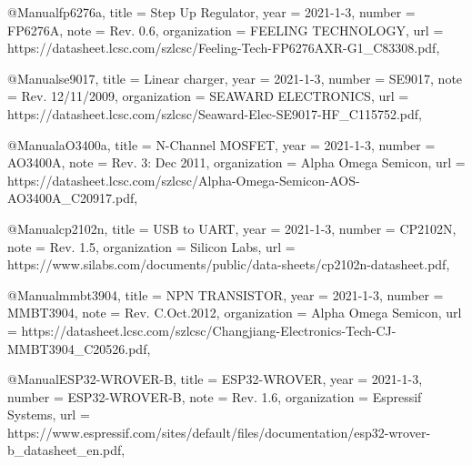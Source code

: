 @Manual{fp6276a,
    title        = {Step Up Regulator},
    year         = {2021-1-3},
    number       = {FP6276A},
    note         = {Rev. 0.6},
    organization = {FEELING TECHNOLOGY},
    url          = {https://datasheet.lcsc.com/szlcsc/Feeling-Tech-FP6276AXR-G1\_C83308.pdf},
}

@Manual{se9017,
    title        = {Linear charger},
    year         = {2021-1-3},
    number       = {SE9017},
    note         = {Rev. 12/11/2009},
    organization = {SEAWARD ELECTRONICS},
    url          = {https://datasheet.lcsc.com/szlcsc/Seaward-Elec-SE9017-HF\_C115752.pdf},
}

@Manual{aO3400a,
    title        = {N-Channel MOSFET},
    year         = {2021-1-3},
    number       = {AO3400A},
    note         = {Rev. 3: Dec 2011},
    organization = {Alpha Omega Semicon},
    url          = {https://datasheet.lcsc.com/szlcsc/Alpha-Omega-Semicon-AOS-AO3400A\-\_C20917.pdf},
}

@Manual{cp2102n,
    title        = {USB to UART},
    year         = {2021-1-3},
    number       = {CP2102N},
    note         = {Rev. 1.5},
    organization = {Si\-li\-con Labs},
    url          = {https://www.si\-la\-bs\-.com/documents/public/data-sheets/cp2102n-datasheet.pdf},
}

@Manual{mmbt3904,
    title        = {NPN TRANSISTOR},
    year         = {2021-1-3},
    number       = {MMBT3904},
    note         = {Rev. C.Oct.2012},
    organization = {Alpha Omega Semicon},
    url          = {https://datasheet.lcsc.com/szlcsc/Changjiang-Electronics-Tech-CJ-MMBT3904\_C20526.pdf},
}

@Manual{ESP32-WROVER-B,
    title        = {ESP32-WROVER},
    year         = {2021-1-3},
    number       = {ESP32-WROVER-B},
    note         = {Rev.  1.6},
    organization = {Espressif Systems},
    url          = {https://www.espressif.com/sites/default/files/documentation/\-esp32-wrover-b\_datasheet\_en.pdf},
}

